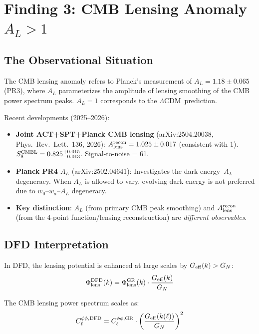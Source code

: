 \documentclass[11pt,a4paper]{article}
\newcommand{\LCDM}{$\Lambda$CDM}
\newcommand{\Geff}{G_{\rm eff}}
\begin{document}
\section{Finding 3: CMB Lensing Anomaly $A_L > 1$}
\label{sec:cmb-lensing}

\subsection{The Observational Situation}

The CMB lensing anomaly refers to Planck's measurement of
$A_L = 1.18 \pm 0.065$ (PR3), where $A_L$ parameterizes the
amplitude of lensing smoothing of the CMB power spectrum peaks.
$A_L = 1$ corresponds to the \LCDM\ prediction.

Recent developments (2025--2026):
\begin{itemize}
\item \textbf{Joint ACT+SPT+Planck CMB lensing} (arXiv:2504.20038,
  Phys.\ Rev.\ Lett.\ 136, 2026):
  $A_{\rm lens}^{\rm recon} = 1.025 \pm 0.017$ (consistent with 1).
  $S_8^{\rm CMBL} = 0.825^{+0.015}_{-0.013}$.  Signal-to-noise = 61.
\item \textbf{Planck PR4 $A_L$} (arXiv:2502.04641):
  Investigates the dark energy--$A_L$ degeneracy.  When $A_L$ is
  allowed to vary, evolving dark energy is not preferred due to
  $w_0$--$w_a$--$A_L$ degeneracy.
\item \textbf{Key distinction}: $A_L$ (from primary CMB peak smoothing)
  and $A_{\rm lens}^{\rm recon}$ (from the 4-point function/lensing
  reconstruction) are \emph{different observables}.
\end{itemize}

\subsection{DFD Interpretation}

In DFD, the lensing potential is enhanced at large scales by $\Geff(k) > G_N$:
\begin{equation}
\Phi_{\rm lens}^{\rm DFD}(k) = \Phi_{\rm lens}^{\rm GR}(k) \cdot
\frac{\Geff(k)}{G_N}
\end{equation}

The CMB lensing power spectrum scales as:
\begin{equation}
C_\ell^{\phi\phi, \rm DFD} = C_\ell^{\phi\phi, \rm GR} \cdot
\left(\frac{\Geff(k(\ell))}{G_N}\right)^2
\end{equation}
\end{document}
